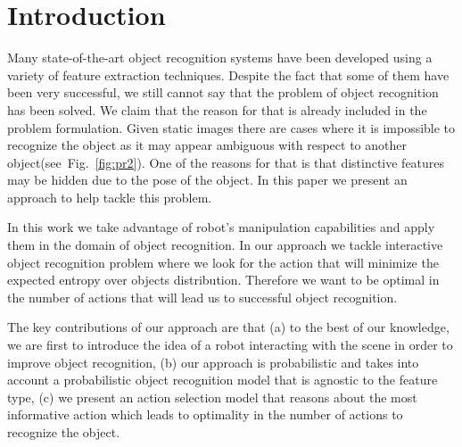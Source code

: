 \documentclass[conference]{IEEEtran}
\newcommand{\figref}[1]{Fig.~\ref{#1}}
\begin{document}
\IEEEpeerreviewmaketitle

\section{Introduction}


    Many state-of-the-art object recognition systems have been developed using a variety of feature extraction techniques. Despite the fact that some of them have been very successful, we still cannot say that the problem of object recognition has been solved. We claim that the reason for that is already included in the problem formulation. Given static images there are cases where it is impossible to recognize the object as it may appear ambiguous with respect to another object(see~\figref{fig:pr2}). One of the reasons for that is that distinctive features may be hidden due to the pose of the object.  In this paper we present an approach to help tackle this problem.
    
    In this work we take advantage of robot's manipulation capabilities and apply them in the domain of object recognition. In our approach we tackle interactive object recognition problem where we look for the action that will minimize the expected entropy over objects distribution. Therefore we want to be optimal in the number of actions that will lead us to successful object recognition.

	The key contributions of our approach are that (a) to the best of our knowledge, we are first to introduce the idea of a robot interacting with the scene in order to improve object recognition, (b) our approach is probabilistic and takes into account a probabilistic object recognition model that is agnostic to the feature type, (c) we present an action selection model that reasons about the most informative action which leads to optimality in the number of actions to recognize the object.
	
	
    
\end{document}
